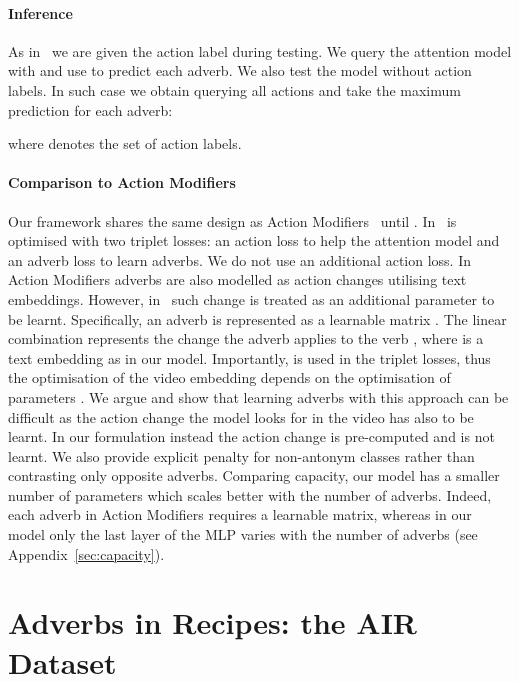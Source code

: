 \documentclass[10pt,twocolumn,letterpaper]{article}
\newcommand{\fparagraph}[1]{\paragraph{#1}}
\begin{document}
\vspace{-10pt}

\fparagraph{Inference} As in~\cite{doughty2020action} we are given the action label  during testing. We query the attention model with  and use  
to predict 
each adverb.
We also test the model without action labels. 
In such case we obtain 
querying all actions 
and take the maximum prediction for each adverb: 

\vspace{-10pt}



\noindent where  denotes the set of action labels. 

\paragraph{Comparison to Action Modifiers} Our framework shares the same design  as Action Modifiers~\cite{doughty2020action} until . In~\cite{doughty2020action}  is optimised with two triplet losses: an action loss to help the attention model and an adverb loss to learn adverbs. 
We do not use an additional action loss. 
In Action Modifiers adverbs are also modelled as action changes utilising text embeddings. However, in~\cite{doughty2020action} such change is treated as an additional parameter to be learnt. Specifically, an adverb is represented as a learnable matrix . The linear combination  represents the change the adverb  applies to the verb , where  is a text embedding as in our model. Importantly,  is used in the triplet losses, thus the optimisation of the video embedding  depends on the optimisation of parameters . We argue and show that learning adverbs with this approach  
can be difficult as the action change the model looks for in the video has also to be learnt. In our formulation instead the 
action change is pre-computed and is not learnt. 
We also provide explicit penalty for non-antonym classes rather than contrasting only opposite adverbs.
Comparing capacity, our model has a smaller number of parameters which scales better with the number of adverbs. Indeed, each adverb in Action Modifiers requires a learnable matrix, whereas in our model only the last layer of the MLP varies with the number of adverbs (see Appendix~\ref{sec:capacity}). 

\vspace{-7pt}
\section{Adverbs in Recipes: the AIR Dataset}
\label{sec:our_dataset}
\end{document}
